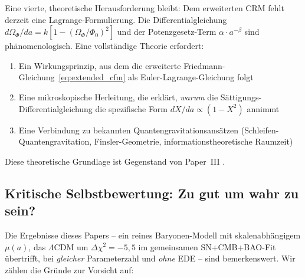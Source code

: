 \documentclass[aps,prd,twocolumn,superscriptaddress,nofootinbib]{revtex4-2}
\begin{document}
Eine vierte, theoretische Herausforderung bleibt: Dem erweiterten CRM fehlt derzeit eine Lagrange-Formulierung. Die Differentialgleichung $d\Omega_\Phi/da = k[1 - (\Omega_\Phi/\Phi_0)^2]$ und der Potenzgesetz-Term $\alpha \cdot a^{-\beta}$ sind ph\"anomenologisch. Eine vollst\"andige Theorie erfordert:
\begin{enumerate}
\item Ein Wirkungsprinzip, aus dem die erweiterte Friedmann-Gleichung~\eqref{eq:extended_cfm} als Euler-Lagrange-Gleichung folgt
\item Eine mikroskopische Herleitung, die erkl\"art, \textit{warum} die S\"attigungs-Differentialgleichung die spezifische Form $dX/da \propto (1 - X^2)$ annimmt
\item Eine Verbindung zu bekannten Quantengravitationsans\"atzen (Schleifen-Quantengravitation, Finsler-Geometrie, informationstheoretische Raumzeit)
\end{enumerate}

Diese theoretische Grundlage ist Gegenstand von Paper~III \cite{Geiger2026c}.

\subsection{Kritische Selbstbewertung: Zu gut um wahr zu sein?}

Die Ergebnisse dieses Papers -- ein reines Baryonen-Modell mit skalenabh\"angigem $\mu(a)$, das $\Lambda$CDM um $\Delta\chi^2 = -5{,}5$ im gemeinsamen SN+CMB+BAO-Fit \"ubertrifft, bei \textit{gleicher} Parameterzahl und \textit{ohne} EDE -- sind bemerkenswert. Wir z\"ahlen die Gr\"unde zur Vorsicht auf:
\end{document}
